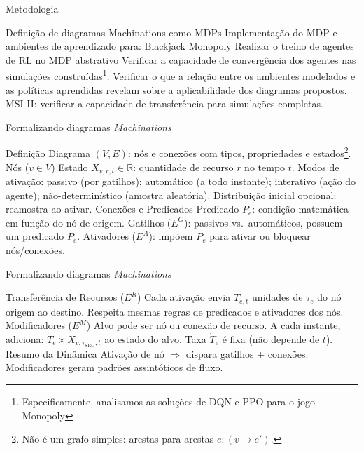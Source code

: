 \documentclass[aspectratio=169]{beamer}
\begin{document}
\begin{frame}{Metodologia}
    \begin{outline}[enumerate]
	\1 Definição de diagramas Machinations como MDPs
	\1 Implementação do MDP e ambientes de aprendizado para:
            \2 Blackjack
            \2 Monopoly
	\1 Realizar o treino de agentes de RL no MDP abstrativo
    \1 Verificar a capacidade de convergência dos agentes nas simulações construídas\footnote{Especificamente, analisamos as soluções de DQN e PPO para o jogo Monopoly}.
    \1 Verificar o que a relação entre os ambientes modelados e as políticas aprendidas revelam sobre a aplicabilidade dos diagramas propostos.
    \1 MSI II: verificar a capacidade de transferência para simulações completas.
    \end{outline}
\end{frame}

\begin{frame}{Formalizando diagramas \textit{Machinations}}
    \begin{outline}
      \1 Definição
            \2 Diagrama $(V, E)$: nós e conexões com tipos, propriedades e estados\footnote{Não é um grafo simples: arestas para arestas $e:(v\rightarrow e')$.}.
      \1 Nós ($v\in V$)
         \2 Estado $X_{v,r,t}\in\mathbb{R}$: quantidade de recurso $r$ no tempo $t$.
         \2 Modos de ativação: passivo (por gatilhos); automático (a todo instante); interativo (ação do agente); não-determinístico (amostra aleatória).
         \2 Distribuição inicial opcional: reamostra ao ativar.
      \1 Conexões e Predicados
         \2 Predicado $P_e$: condição matemática em função do nó de origem.
         \2 Gatilhos ($E^G$): passivos vs.\ automáticos, possuem um predicado $P_e$.
         \2 Ativadores ($E^A$): impõem $P_e$ para ativar ou bloquear nós/conexões.
  \end{outline}
\end{frame}

\begin{frame}{Formalizando diagramas \textit{Machinations}}
    \begin{outline}
      \1 Transferência de Recursos ($E^R$)
         \2 Cada ativação envia $T_{e,t}$ unidades de $\tau_e$ do nó origem ao destino.
         \2 Respeita mesmas regras de predicados e ativadores dos nós.
      \1 Modificadores ($E^M$)
         \2 Alvo pode ser nó ou conexão de recurso.
         \2 A cada instante, adiciona:
            \3 $\dot{T}_e \times X_{v,\tau_{\text{SRC}},t}$ ao estado do alvo.
         \2 Taxa $\dot{T}_e$ é fixa (não depende de $t$).
      \1 Resumo da Dinâmica
         \2 Ativação de nó $\Rightarrow$ dispara gatilhos + conexões.
         \2 Modificadores geram padrões assintóticos de fluxo.
  \end{outline}
\end{frame}
\end{document}
